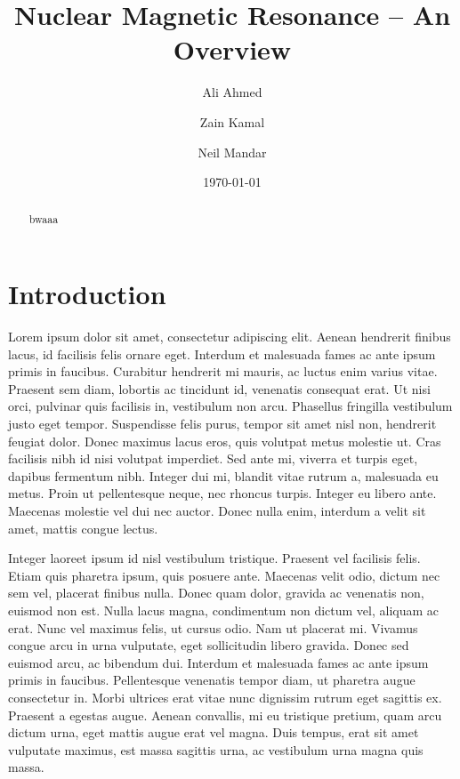 \documentclass[%
 reprint,
 amsmath,amssymb,
 aps,
]{revtex4-2}
\begin{document}

\title{Nuclear Magnetic Resonance -- An Overview}

\author{Ali Ahmed}
\author{Zain Kamal}%
\author{Neil Mandar}%



\date{\today}%

\begin{abstract}
bwaaa
\end{abstract}

\maketitle


\section{\label{sec:level1}Introduction}


Lorem ipsum dolor sit amet, consectetur adipiscing elit. Aenean hendrerit finibus lacus, id facilisis felis ornare eget. Interdum et malesuada fames ac ante ipsum primis in faucibus. Curabitur hendrerit mi mauris, ac luctus enim varius vitae. Praesent sem diam, lobortis ac tincidunt id, venenatis consequat erat. Ut nisi orci, pulvinar quis facilisis in, vestibulum non arcu. Phasellus fringilla vestibulum justo eget tempor. Suspendisse felis purus, tempor sit amet nisl non, hendrerit feugiat dolor. Donec maximus lacus eros, quis volutpat metus molestie ut. Cras facilisis nibh id nisi volutpat imperdiet. Sed ante mi, viverra et turpis eget, dapibus fermentum nibh. Integer dui mi, blandit vitae rutrum a, malesuada eu metus. Proin ut pellentesque neque, nec rhoncus turpis. Integer eu libero ante. Maecenas molestie vel dui nec auctor. Donec nulla enim, interdum a velit sit amet, mattis congue lectus.

Integer laoreet ipsum id nisl vestibulum tristique. Praesent vel facilisis felis. Etiam quis pharetra ipsum, quis posuere ante. Maecenas velit odio, dictum nec sem vel, placerat finibus nulla. Donec quam dolor, gravida ac venenatis non, euismod non est. Nulla lacus magna, condimentum non dictum vel, aliquam ac erat. Nunc vel maximus felis, ut cursus odio. Nam ut placerat mi. Vivamus congue arcu in urna vulputate, eget sollicitudin libero gravida. Donec sed euismod arcu, ac bibendum dui. Interdum et malesuada fames ac ante ipsum primis in faucibus. Pellentesque venenatis tempor diam, ut pharetra augue consectetur in. Morbi ultrices erat vitae nunc dignissim rutrum eget sagittis ex. Praesent a egestas augue. Aenean convallis, mi eu tristique pretium, quam arcu dictum urna, eget mattis augue erat vel magna. Duis tempus, erat sit amet vulputate maximus, est massa sagittis urna, ac vestibulum urna magna quis massa.
\end{document}
